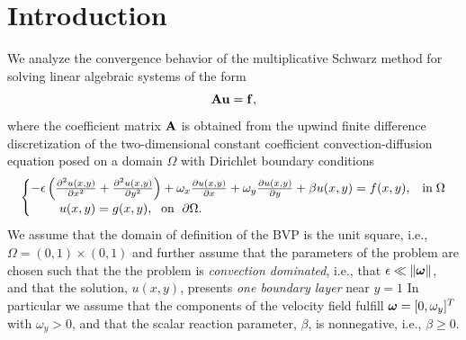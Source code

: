 \section{Introduction}
\label{2D:intro}
We analyze the convergence behavior of the multiplicative Schwarz method for
solving linear algebraic systems of the form
%
\begin{equation}
\label{eq:2D:linsys}
\mathbf{A}\mathbf{u}=\mathbf{f},
\end{equation}
%
where the coefficient matrix $\mathbf{A}$ is obtained from the upwind finite difference
discretization of the two-dimensional constant coefficient convection-diffusion
equation posed on a domain $\Omega$ with Dirichlet boundary conditions
%
\begin{equation}\label{eq:2D:2Dbvp}
\begin{cases}
-\epsilon\left(\frac{\partial^2 u(x,y)}{\partial x^2} + \frac{\partial^2 u(x,y)}{\partial y^2}\right) + \omega_x \frac{\partial u(x,y)}{\partial x} + \omega_y \frac{\partial u(x,y)}{\partial y}+ \beta u(x,y)=f(x,y), & \text{in}\; \Omega\\
\hspace{0.8cm} u(x,y)=g(x,y),\;\text{ on }\;\partial\Omega. &
\end{cases}
\end{equation}
%
We assume
that the domain of definition of the BVP is the unit square, i.e.,
$\Omega=(0,1)\times(0,1)$ and further assume that the parameters of the problem
are chosen such that the the problem is \emph{convection dominated}, i.e., that
$\epsilon\ll \|\bm{\omega}\|$, and that the solution, $u(x,y)$, presents
\emph{one boundary layer} near $y=1$
In particular we assume that the components of the velocity field fulfill $\bm{\omega}=[0,\omega_y]^T$ with $\omega_y>0$, and that the scalar reaction parameter, $\beta$, is nonnegative, i.e., $\beta \geq 0$.

